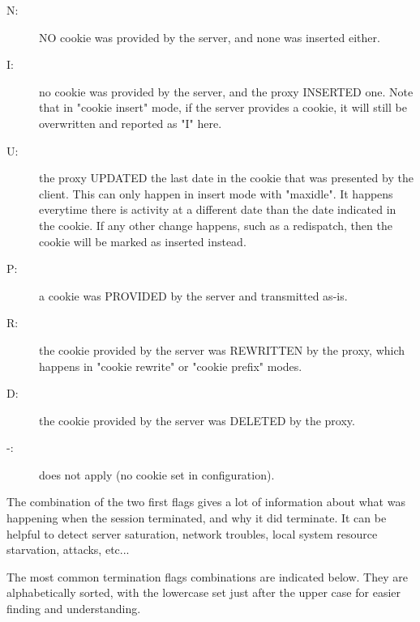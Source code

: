\begin{itemize}
        \begin{description}
        \item[N:]
            NO cookie was provided by the server, and none was inserted either.
        \item[I:]
            no cookie was provided by the server, and the proxy INSERTED one.
            Note that in "cookie insert" mode, if the server provides a cookie,
            it will still be overwritten and reported as "I" here.
        \item[U:]
            the proxy UPDATED the last date in the cookie that was presented by
            the client. This can only happen in insert mode with "maxidle". It
            happens everytime there is activity at a different date than the
            date indicated in the cookie. If any other change happens, such as
            a redispatch, then the cookie will be marked as inserted instead.
        \item[P:]
            a cookie was PROVIDED by the server and transmitted as-is.
        \item[R:]
            the cookie provided by the server was REWRITTEN by the proxy, which
            happens in "cookie rewrite" or "cookie prefix" modes.
        \item[D:]
            the cookie provided by the server was DELETED by the proxy.
        \item[-:]
            does not apply (no cookie set in configuration).
        \end{description}
\end{itemize}

The combination of the two first flags gives a lot of information about what
was happening when the session terminated, and why it did terminate. It can be
helpful to detect server saturation, network troubles, local system resource
starvation, attacks, etc...

The most common termination flags combinations are indicated below. They are
alphabetically sorted, with the lowercase set just after the upper case for
easier finding and understanding.

